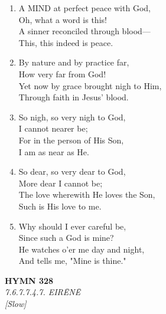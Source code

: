 \begin{enumerate}
    \item A MIND at perfect peace with God, \\
        Oh, what a word is this! \\
        A sinner reconciled through blood--- \\
        This, this indeed is peace.

    \item By nature and by practice far, \\
        How very far from God! \\
        Yet now by grace brought nigh to Him, \\
        Through faith in Jesus' blood.

    \item So nigh, so very nigh to God, \\
        I cannot nearer be; \\
        For in the person of His Son, \\
        I am as near as He.

    \item So dear, so very dear to God, \\
        More dear I cannot be; \\
        The love wherewith He loves the Son, \\
        Such is His love to me.

    \item Why should I ever careful be, \\
        Since such a God is mine? \\
        He watches o'er me day and night, \\
        And tells me, "Mine is thine."

\end{enumerate}

\newpage
\begin{center}
    {\Large \textbf{HYMN 328}}
    \\
    \textit{7.6.7.7.4.7. EIRĒNĒ}
    \\
    \textit{\small [Slow]}
\end{center}
\vspace{1em}


